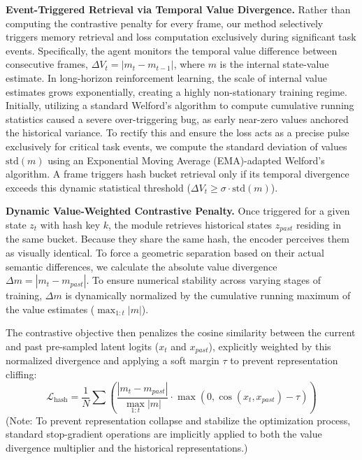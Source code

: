 \documentclass{article} %
\begin{document}
\textbf{Event-Triggered Retrieval via Temporal Value Divergence.}
Rather than computing the contrastive penalty for every frame, our method selectively triggers memory retrieval and loss computation exclusively during significant task events. Specifically, the agent monitors the temporal value difference between consecutive frames, $\Delta V_t = |m_t - m_{t-1}|$, where $m$ is the internal state-value estimate. In long-horizon reinforcement learning, the scale of internal value estimates grows exponentially, creating a highly non-stationary training regime. Initially, utilizing a standard Welford's algorithm to compute cumulative running statistics caused a severe over-triggering bug, as early near-zero values anchored the historical variance. To rectify this and ensure the loss acts as a precise pulse exclusively for critical task events, we compute the standard deviation of values $\text{std}(m)$ using an Exponential Moving Average (EMA)-adapted Welford's algorithm. A frame triggers hash bucket retrieval only if its temporal divergence exceeds this dynamic statistical threshold ($\Delta V_t \ge \sigma \cdot \text{std}(m)$).

\textbf{Dynamic Value-Weighted Contrastive Penalty.}
Once triggered for a given state $z_t$ with hash key $k$, the module retrieves historical states $z_{past}$ residing in the same bucket. Because they share the same hash, the encoder perceives them as visually identical. To force a geometric separation based on their actual semantic differences, we calculate the absolute value divergence $\Delta m = |m_t - m_{past}|$. To ensure numerical stability across varying stages of training, $\Delta m$ is dynamically normalized by the cumulative running maximum of the value estimates ($\max_{1:t} |m|$).

The contrastive objective then penalizes the cosine similarity between the current and past pre-sampled latent logits ($x_t$ and $x_{past}$), explicitly weighted by this normalized divergence and applying a soft margin $\tau$ to prevent representation cliffing:
\begin{equation}
    \mathcal{L}_{\text{hash}} = \frac{1}{N} \sum \left( \frac{|m_t - m_{past}|}{\max_{1:t} |m|} \cdot \max(0, \cos(x_t, x_{past}) - \tau) \right)
\end{equation}
(Note: To prevent representation collapse and stabilize the optimization process, standard stop-gradient operations are implicitly applied to both the value divergence multiplier and the historical representations.)
\end{document}
